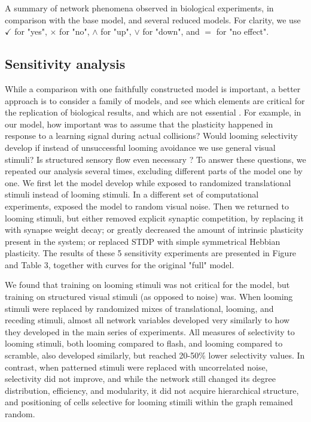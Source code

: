 \documentclass{article}
\begin{document}
\begin{table}
    
    \caption{A summary of network phenomena observed in biological experiments, in comparison with the base model, and several reduced models. For clarity, we use $\checkmark$ for "yes", $\times$ for "no", $\land$ for "up", $\lor$ for "down", and $=$ for "no effect".}
\end{table}

\subsection*{Sensitivity analysis}

While a comparison with one faithfully constructed model is important, a better approach is to consider a family of models, and see which elements are critical for the replication of biological results, and which are not essential \citep{linderman2017constrain,pauli2018repro}. For example, in our model, how important was to assume that the plasticity happened in response to a learning signal during actual collisions? Would  looming selectivity develop if instead of unsuccessful looming avoidance we use general visual stimuli? Is structured sensory flow even necessary \citep{triplett2018emergence}? To answer these questions, we repeated our analysis several times, excluding different parts of the model one by one. We first let the model develop while exposed to randomized translational stimuli instead of looming stimuli. In a different set of computational experiments, exposed the model to random visual noise. Then we returned to looming stimuli, but either removed explicit synaptic competition, by replacing it with synapse weight decay; or greatly decreased the amount of intrinsic plasticity present in the system; or replaced STDP with simple symmetrical Hebbian plasticity. The results of these 5 sensitivity experiments are presented in Figure and Table 3, together with curves for the original "full" model.

We found that training on looming stimuli was not critical for the model, but training on structured visual stimuli (as opposed to noise) was. When looming stimuli were replaced by randomized mixes of translational, looming, and receding stimuli, almost all network variables developed very similarly to how they developed in the main series of experiments. All measures of selectivity to looming stimuli, both looming compared to flash, and looming compared to scramble, also developed similarly, but reached 20-50\% lower selectivity values. In contrast, when patterned stimuli were replaced with uncorrelated noise, selectivity did not improve, and while the network still changed its degree distribution, efficiency, and modularity, it did not acquire hierarchical structure, and positioning of cells selective for looming stimili within the graph remained random.
\end{document}
